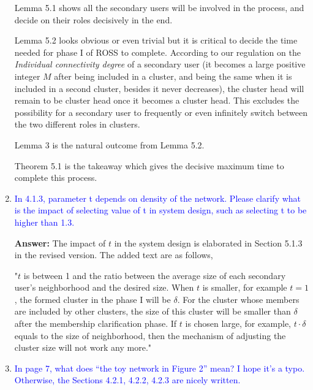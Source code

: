 \documentclass[10pt,a4paper]{article}
\begin{document}
\begin{enumerate}
	Lemma 5.1 shows all the secondary users will be involved in the process, and decide on their roles decisively in the end.
	
	Lemma 5.2 looks obvious or even trivial but it is critical to decide the time needed for phase I of ROSS to complete.
	According to our regulation on the \textit{Individual connectivity degree} of a secondary user (it becomes a large positive integer $M$ after being included in a cluster, and being the same when it is included in a second cluster, besides it never decreases), the cluster head will remain to be cluster head once it becomes a cluster head.
	This excludes the possibility for a secondary user to frequently or even infinitely switch between the two different roles in clusters.
	
	Lemma 3 is the natural outcome from Lemma 5.2.
	
	Theorem 5.1  is the takeaway which gives the decisive maximum time to complete this process.
	
	
	
	
\item \textcolor{blue}{  In 4.1.3, parameter t depends on density of the network. Please clarify what is the impact of selecting value of t in system design, such as selecting t to be higher than 1.3.}

\textbf{Answer:}	
The impact of $t$ in the system design is elaborated in Section 5.1.3 in the revised version.
The added text are as follows,

"$t$ is between 1 and the ratio between the average size of each secondary user's neighborhood and the desired size.
	When $t$ is smaller, for example $t=1$, the formed cluster in the phase I will be $\delta$.
	For the cluster whose members are included by other clusters, the size of this cluster will be smaller than $\delta$ after the membership clarification phase.
	If $t$ is chosen large, for example, $t\cdot\delta$ equals to the size of neighborhood, then the mechanism of adjusting the cluster size will not work any more."


    
\item \textcolor{blue}{  In page 7, what does “the toy network in Figure 2” mean? I hope it’s a typo. Otherwise, the Sections 4.2.1, 4.2.2, 4.2.3 are nicely written.}


\end{enumerate}
\end{document}
